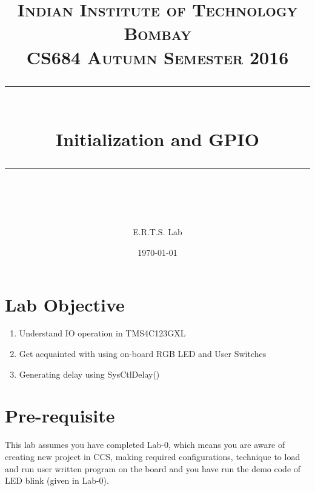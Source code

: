 \documentclass{article} %
\title{
\normalfont \normalsize 
\textsc{Indian Institute of Technology Bombay \\ 
CS684 Autumn Semester 2016} \\
[10pt] 
\rule{\linewidth}{0.5pt} \\[6pt] 
\huge Initialization and GPIO \\
\rule{\linewidth}{2pt}  \\[10pt]
}
\author{E.R.T.S. Lab}
\date{\normalsize \today}
\begin{document}
\maketitle
\noindent



%
%
%
%





\section{Lab Objective}
\begin{enumerate}
\item 
Understand IO operation in TMS4C123GXL
\item
Get acquainted with using on-board RGB LED and User Switches
\item
Generating delay using SysCtlDelay()
\end{enumerate}






\section{Pre-requisite}
This lab assumes you have completed Lab-0, which means you are aware of creating new project in
CCS, making required configurations, technique to load and run user written program on the board
and you have run the demo code of LED blink (given in Lab-0).
\end{document}
